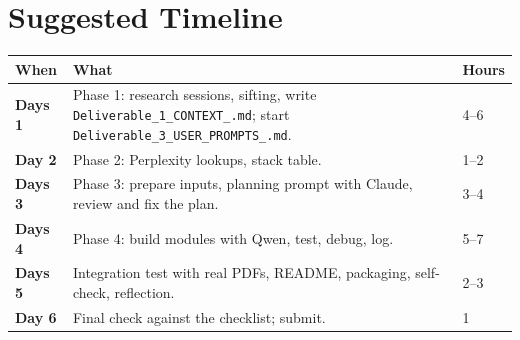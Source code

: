 \documentclass[11pt,a4paper]{article}
\newcommand{\uid}{[HeUserID]}
\newcommand{\dA}{\texttt{Deliverable\_1\_\allowbreak CONTEXT\_\allowbreak\uid.md}}
\newcommand{\dC}{\texttt{Deliverable\_3\_\allowbreak USER\_PROMPTS\_\allowbreak\uid.md}}
\begin{document}
\section{Suggested Timeline}
\begin{tabularx}{\textwidth}{@{}>{\bfseries}p{3cm}L p{2.4cm}@{}}
\toprule
\textbf{When} & \textbf{What} & \textbf{Hours}\\
\midrule
Days 1& Phase 1: research sessions, sifting, write \dA; start \dC. & 4--6\\
Day 2 & Phase 2: Perplexity lookups, stack table. & 1--2\\
Days 3 & Phase 3: prepare inputs, planning prompt with Claude, review and fix the plan. & 3--4\\
Days 4 & Phase 4: build modules with Qwen, test, debug, log. & 5--7\\
Days 5 & Integration test with real PDFs, README, packaging, self-check, reflection. & 2--3\\
Day 6 & Final check against the checklist; submit. & 1\\
\bottomrule
\end{tabularx}

\newpage

\end{document}
